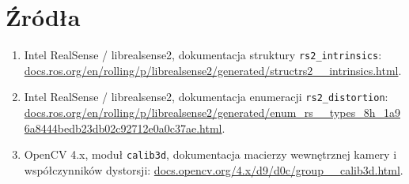 \documentclass[12pt,a4paper]{report}
\begin{document}
\section*{Źródła}
\begin{enumerate}
    \item Intel RealSense / librealsense2, dokumentacja struktury \texttt{rs2\_intrinsics}: \href{https://docs.ros.org/en/rolling/p/librealsense2/generated/structrs2__intrinsics.html}{docs.ros.org/en/rolling/p/librealsense2/generated/structrs2\_\_intrinsics.html}.
    \item Intel RealSense / librealsense2, dokumentacja enumeracji \texttt{rs2\_distortion}: \href{https://docs.ros.org/en/rolling/p/librealsense2/generated/enum_rs__types_8h_1a96a8444bedb23db02c92712e0a0c37ae.html}{docs.ros.org/en/rolling/p/librealsense2/generated/enum\_rs\_\_types\_8h\_1a96a8444bedb23db02c92712e0a0c37ae.html}.
    \item OpenCV 4.x, moduł \texttt{calib3d}, dokumentacja macierzy wewnętrznej kamery i współczynników dystorsji: \href{https://docs.opencv.org/4.x/d9/d0c/group__calib3d.html}{docs.opencv.org/4.x/d9/d0c/group\_\_calib3d.html}.
\end{enumerate}
\end{document}
